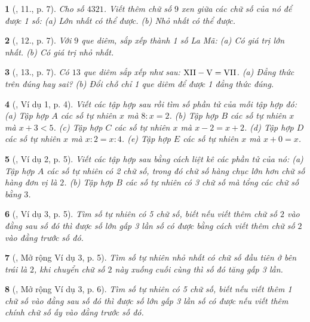 \documentclass{article}
\newtheorem{baitoan}{}
\begin{document}
\begin{baitoan}[\cite{Tuyen_Toan_6}, 11., p. 7]
	Cho số $4321$. Viết thêm chữ số $9$ xen giữa các chữ số của nó để được 1 số: (a) Lớn nhất có thể được. (b) Nhỏ nhất có thể được.
\end{baitoan}

\begin{baitoan}[\cite{Tuyen_Toan_6}, 12., p. 7]
	Với $9$ que diêm, sắp xếp thành 1 số La Mã: (a) Có giá trị lớn nhất. (b) Có giá trị nhỏ nhất.
\end{baitoan}

\begin{baitoan}[\cite{Tuyen_Toan_6}, 13., p. 7]
	Có $13$ que diêm sắp xếp như sau: $\rm XII - V = VII$. (a) Đẳng thức trên đúng hay sai? (b) Đổi chỗ chỉ 1 que diêm để được 1 đẳng thức đúng.
\end{baitoan}

\begin{baitoan}[\cite{Binh_Toan_6_tap_1}, Ví dụ 1, p. 4]
	Viết các tập hợp sau rồi tìm số phần tử của mỗi tập hợp đó: (a) Tập hợp $A$ các số tự nhiên $x$ mà $8:x = 2$. (b) Tập hợp $B$ các số tự nhiên $x$ mà $x + 3 < 5$. (c) Tập hợp $C$ các số tự nhiên $x$ mà $x - 2 = x + 2$. (d) Tập hợp $D$ các số tự nhiên $x$ mà $x:2 = x:4$. (e) Tập hợp $E$ các số tự nhiên $x$ mà $x + 0 = x$.
\end{baitoan}

\begin{baitoan}[\cite{Binh_Toan_6_tap_1}, Ví dụ 2, p. 5]
	Viết các tập hợp sau bằng cách liệt kê các phần tử của nó: (a) Tập hợp $A$ các số tự nhiên có 2 chữ số, trong đó chữ số hàng chục lớn hơn chữ số hàng đơn vị là $2$. (b) Tập hợp $B$ các số tự nhiên có 3 chữ số mà tổng các chữ số bằng $3$.
\end{baitoan}

\begin{baitoan}[\cite{Binh_Toan_6_tap_1}, Ví dụ 3, p. 5]
	Tìm số tự nhiên có 5 chữ số, biết nếu viết thêm chữ số $2$ vào đằng sau số đó thì được số lớn gấp 3 lần số có được bằng cách viết thêm chữ số $2$ vào đằng trước số đó.
\end{baitoan}

\begin{baitoan}[\cite{Binh_Toan_6_tap_1}, Mở rộng Ví dụ 3, p. 5]
	Tìm số tự nhiên nhỏ nhất có chữ số đầu tiên ở bên trái là $2$, khi chuyển chữ số $2$ này xuống cuối cùng thì số đó tăng gấp 3 lần.
\end{baitoan}

\begin{baitoan}[\cite{Binh_Toan_6_tap_1}, Mở rộng Ví dụ 3, p. 6]
	Tìm số tự nhiên có 5 chữ số, biết nếu viết thêm 1 chữ số vào đằng sau số đó thì được số lớn gấp 3 lần số có được nếu viết thêm chính chữ số ấy vào đằng trước số đó.
\end{baitoan}
\end{document}
